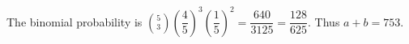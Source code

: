 The binomial probability is $\binom53(\dfrac{4}{5})^3(\dfrac{1}{5})^2=\dfrac{640}{3125}=\dfrac{128}{625}$. Thus $\boxed{a+b=753}$.
